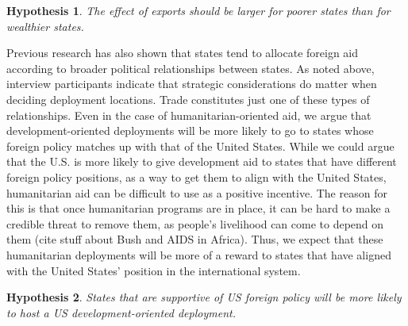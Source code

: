 \documentclass[12pt]{article}
\newtheorem{hyp}{Hypothesis}
\begin{document}
\begin{doublespace}

\begin{hyp}
     The effect of exports should be larger for poorer states than for wealthier states.
\end{hyp}

Previous research has also shown that states tend to allocate foreign aid according to broader political relationships between states. As noted above, interview participants indicate that strategic considerations do matter when deciding deployment locations. Trade constitutes just one of these types of relationships. Even in the case of humanitarian-oriented aid, we argue that development-oriented deployments will be more likely to go to states whose foreign policy matches up with that of the United States.  While we could argue that the U.S. is more likely to give development aid to states that have different foreign policy positions, as a way to get them to align with the United States, humanitarian aid can be difficult to use as a positive incentive.  The reason for this is that once humanitarian programs are in place, it can be hard to make a credible threat to remove them, as people's livelihood can come to depend on them (cite stuff about Bush and AIDS in Africa).  Thus, we expect that these humanitarian deployments will be more of a reward to states that have aligned with the United States' position in the international system.     

\begin{hyp}
States that are supportive of US foreign policy will be more likely to host a US development-oriented deployment.
\end{hyp}




\end{doublespace}
\end{document}
